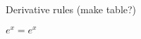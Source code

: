 \documentclass[../doc.tex]{subfiles}
\begin{document}
Derivative rules (make table?)

$e^x = e^x$
\end{document}
